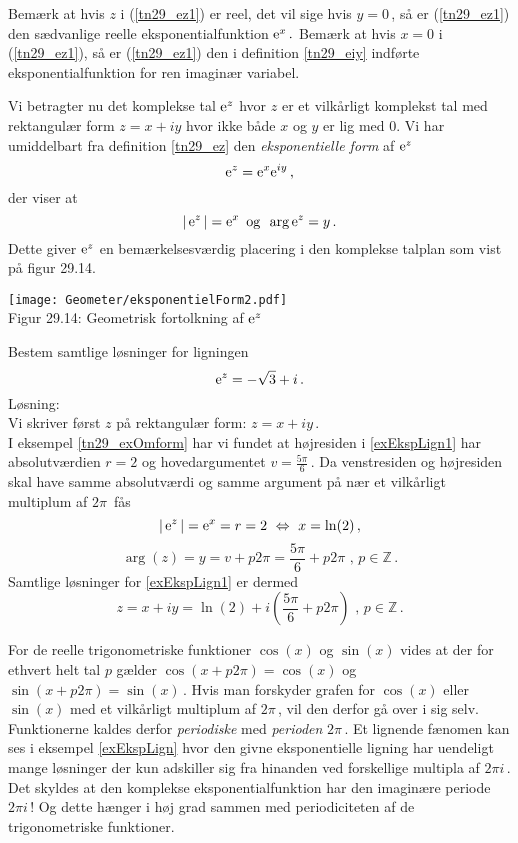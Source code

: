 \begin{aha}
Bemærk at hvis $z$ i (\ref{tn29_ez1}) er reel, det vil sige hvis $y=0\,$, så er (\ref{tn29_ez1}) den sædvanlige reelle eksponentialfunktion $\mathrm{e}^x\,.$\bs
Bemærk at hvis $x=0$ i (\ref{tn29_ez1}), så er (\ref{tn29_ez1}) den i definition \ref{tn29_eiy} indførte eksponentialfunktion for ren imaginær variabel.
\end{aha}

Vi betragter nu det komplekse tal $\mathrm{e}^z$ hvor $z$ er et vilkårligt komplekst tal med rektangulær form $z=x+iy$ hvor ikke både $x$ og $y$ er lig med $0$. Vi har umiddelbart fra definition \ref{tn29_ez} den \textit{eksponentielle form} af $\mathrm{e}^z\,$
$$
\mathrm{e}^z=\mathrm{e}^x\mathrm{e}^{iy}\,,
$$
der viser at
$$
|\,\mathrm{e}^z\,|=\mathrm{e}^x\,\,\,\mathrm{og} \,\,\,\arg{\mathrm{e}^z}=y\,.
$$ 
Dette giver $\mathrm{e}^z$ en bemærkelsesværdig placering i den komplekse talplan som vist på figur 29.14.

\begin{center}
	\texttt{[image: Geometer/eksponentielForm2.pdf]}\\
Figur 29.14: Geometrisk fortolkning af $\mathrm{e}^z$
\end{center}

\begin{example}\label{exEkspLign}
Bestem samtlige løsninger for ligningen
\begin{equation}\label{exEkspLign1}
\mathrm{e}^z=-\sqrt 3+i\,.
\end{equation}
Løsning:\\
Vi skriver først $z$ på rektangulær form: $z=x+iy\,$.\\ 
I eksempel \ref{tn29_exOmform} har vi fundet at højresiden i \ref{exEkspLign1} har absolutværdien $r=2$ og hovedargumentet $v=\frac{5\pi}6\,$. Da venstresiden og højresiden skal have samme absolutværdi og samme argument på nær et vilkårligt multiplum af $2\pi\,$ fås
$$
|\,\mathrm{e}^z\,|=\mathrm{e}^x=r=2\,\,\Leftrightarrow\,\,x=\ln(2)\,,$$
$$\arg(z)=y=v+p2\pi=\frac{5\pi}6 + p2\pi\,\,,\,p\in \mathbb Z\,.$$
Samtlige løsninger for \ref{exEkspLign1} er dermed
$$z=x+iy=\ln(2)+i(\frac{5\pi}6 + p2\pi)\,\,,\,p\in \mathbb Z\,.$$
 
\end{example}

For de reelle trigonometriske funktioner $\cos(x)$ og $\sin(x)$ vides at der for ethvert helt tal $p$ gælder $\cos(x+p2\pi)=\cos(x)$ og $\sin(x+p2\pi)=\sin(x)\,$. Hvis man forskyder grafen for $\cos(x)$ eller $\sin(x)$ med et vilkårligt multiplum af $2\pi\,$, vil den derfor gå over i sig selv. Funktionerne kaldes derfor \textit{periodiske} med \textit{perioden} $2\pi\,$.\bs
Et lignende fænomen kan ses i eksempel \ref{exEkspLign} hvor den givne eksponentielle lig\-ning har uendeligt mange løsninger der kun adskiller sig fra hinanden ved forskellige multipla af $2\pi i\,$. Det skyldes at den komplekse eksponentialfunktion har den ima\-ginære periode $2\pi i\,$! Og dette hænger i høj grad sammen med periodiciteten af de trigonometriske funktioner.


